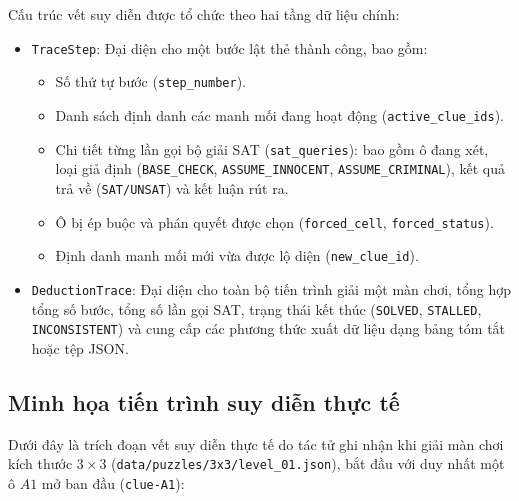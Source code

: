 Cấu trúc vết suy diễn được tổ chức theo hai tầng dữ liệu chính:
\begin{itemize}
    \item \texttt{TraceStep}: Đại diện cho một bước lật thẻ thành công, bao gồm:
    \begin{itemize}
        \item Số thứ tự bước (\texttt{step\_number}).
        \item Danh sách định danh các manh mối đang hoạt động (\texttt{active\_clue\_ids}).
        \item Chi tiết từng lần gọi bộ giải SAT (\texttt{sat\_queries}): bao gồm ô đang xét, loại giả định (\texttt{BASE\_CHECK}, \texttt{ASSUME\_INNOCENT}, \texttt{ASSUME\_CRIMINAL}), kết quả trả về (\texttt{SAT/UNSAT}) và kết luận rút ra.
        \item Ô bị ép buộc và phán quyết được chọn (\texttt{forced\_cell}, \texttt{forced\_status}).
        \item Định danh manh mối mới vừa được lộ diện (\texttt{new\_clue\_id}).
    \end{itemize}
    \item \texttt{DeductionTrace}: Đại diện cho toàn bộ tiến trình giải một màn chơi, tổng hợp tổng số bước, tổng số lần gọi SAT, trạng thái kết thúc (\texttt{SOLVED}, \texttt{STALLED}, \texttt{INCONSISTENT}) và cung cấp các phương thức xuất dữ liệu dạng bảng tóm tắt hoặc tệp JSON.
\end{itemize}

\subsection{Minh họa tiến trình suy diễn thực tế}
Dưới đây là trích đoạn vết suy diễn thực tế do tác tử ghi nhận khi giải màn chơi kích thước $3 \times 3$ (\texttt{data/puzzles/3x3/level\_01.json}), bắt đầu với duy nhất một ô $A1$ mở ban đầu (\texttt{clue-A1}):

